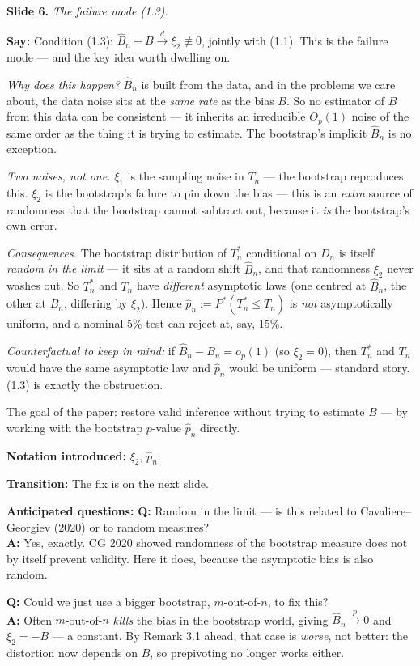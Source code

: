 \documentclass[11pt]{article}
\theoremstyle{definition}
\newcommand{\Pstar}{P^{*}}
\newcommand{\dto}{\xrightarrow{d}}
\newcommand{\pto}{\xrightarrow{p}}
\newcommand{\Tn}{T_{n}}
\newcommand{\Tns}{T_{n}^{*}}
\newcommand{\Bn}{B_{n}}
\newcommand{\Bnh}{\hat{B}_{n}}
\newcommand{\pnh}{\hat{p}_{n}}
\newcommand{\Dn}{D_{n}}
\newcommand{\slide}[2]{%
  \medskip
  \noindent\colorbox{soft}{\parbox{\linewidth}{\textbf{Slide #1.} \textit{#2}}}
  \medskip
}
\newcommand{\say}[1]{\textbf{Say:} #1}
\newcommand{\trans}[1]{\textbf{Transition:} #1}
\newcommand{\Q}[2]{\noindent\textcolor{warn}{\textbf{Q:}} #1\\ \textcolor{accent}{\textbf{A:}} #2\par\smallskip}
\begin{document}
\slide{6}{The failure mode (1.3).}
\say{Condition (1.3): $\Bnh-B\dto\xi_2\not\equiv 0$, jointly with (1.1).
This is the failure mode --- and the key idea worth dwelling on.

\emph{Why does this happen?} $\Bnh$ is built from the data, and in the
problems we care about, the data noise sits at the \emph{same rate} as
the bias $B$. So no estimator of $B$ from this data can be consistent ---
it inherits an irreducible $O_p(1)$ noise of the same order as the thing
it is trying to estimate. The bootstrap's implicit $\Bnh$ is no exception.

\emph{Two noises, not one.} $\xi_1$ is the sampling noise in $\Tn$ ---
the bootstrap reproduces this. $\xi_2$ is the bootstrap's failure to
pin down the bias --- this is an \emph{extra} source of randomness that
the bootstrap cannot subtract out, because it \emph{is} the bootstrap's
own error.

\emph{Consequences.} The bootstrap distribution of $\Tns$ conditional on
$\Dn$ is itself \emph{random in the limit} --- it sits at a random shift
$\Bnh$, and that randomness $\xi_2$ never washes out. So $\Tns$ and $\Tn$
have \emph{different} asymptotic laws (one centred at $\Bnh$, the other at
$\Bn$, differing by $\xi_2$). Hence $\pnh:=\Pstar(\Tns\le\Tn)$ is \emph{not}
asymptotically uniform, and a nominal 5\% test can reject at, say, 15\%.

\emph{Counterfactual to keep in mind:} if $\Bnh-\Bn=o_p(1)$ (so $\xi_2=0$),
then $\Tns$ and $\Tn$ would have the same asymptotic law and $\pnh$ would
be uniform --- standard story. (1.3) is exactly the obstruction.

The goal of the paper: restore valid inference without trying to estimate
$B$ --- by working with the bootstrap $p$-value $\pnh$ directly.}

\textbf{Notation introduced:} $\xi_2,\,\pnh$.

\trans{The fix is on the next slide.}

\textbf{Anticipated questions:}
\Q{Random in the limit --- is this related to Cavaliere--Georgiev (2020) or to
random measures?}
{Yes, exactly. CG 2020 showed randomness of the bootstrap measure does not by
itself prevent validity. Here it does, because the asymptotic bias is also random.}
\Q{Could we just use a bigger bootstrap, $m$-out-of-$n$, to fix this?}
{Often $m$-out-of-$n$ \emph{kills} the bias in the bootstrap world, giving
$\Bnh\pto 0$ and $\xi_2=-B$ --- a constant. By Remark 3.1 ahead, that case
is \emph{worse}, not better: the distortion now depends on $B$, so prepivoting
no longer works either.}
\end{document}
